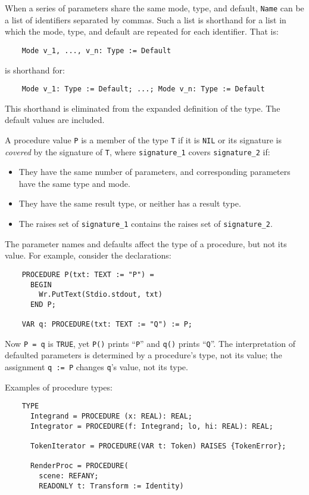 \documentclass[10pt]{article}
\begin{document}
When a series of parameters share the same mode, type, and default,
\verb|Name| can be a list of identifiers separated by commas.  Such a list is
shorthand for a list in which the mode, type, and default are repeated for
each identifier.  That is:
\begin{verbatim}
    Mode v_1, ..., v_n: Type := Default
\end{verbatim}
is shorthand for:
\begin{verbatim}
    Mode v_1: Type := Default; ...; Mode v_n: Type := Default
\end{verbatim}
This shorthand is eliminated from the expanded definition of the type.  The
default values are included.

A procedure value \verb|P| is a member of the type \verb|T| if it is
\verb|NIL| or its signature is \emph{covered} by the signature of \verb|T|,
where \verb|signature_1| covers \verb|signature_2| if:
\begin{itemize}
\item They have the same number of parameters, and corresponding parameters
  have the same type and mode.
\item  They have the same result type, or neither has a result type.
\item The raises set of \verb|signature_1| contains the raises set of
  \verb|signature_2|.
\end{itemize}

The parameter names and defaults affect the type of a procedure, but not its
value.  For example, consider the declarations:
\begin{verbatim}
    PROCEDURE P(txt: TEXT := "P") =
      BEGIN
        Wr.PutText(Stdio.stdout, txt)
      END P;

    VAR q: PROCEDURE(txt: TEXT := "Q") := P;
\end{verbatim}
Now \verb|P = q| is \verb|TRUE|, yet \verb|P()| prints ``\verb|P|'' and
\verb|q()| prints ``\verb|Q|''.  The interpretation of defaulted parameters is
determined by a procedure's type, not its value; the assignment \verb|q := P|
changes \verb|q|'s value, not its type.

Examples of procedure types:
\begin{verbatim}
    TYPE
      Integrand = PROCEDURE (x: REAL): REAL;
      Integrator = PROCEDURE(f: Integrand; lo, hi: REAL): REAL;

      TokenIterator = PROCEDURE(VAR t: Token) RAISES {TokenError};

      RenderProc = PROCEDURE(
        scene: REFANY;
        READONLY t: Transform := Identity)
\end{verbatim}
\end{document}
